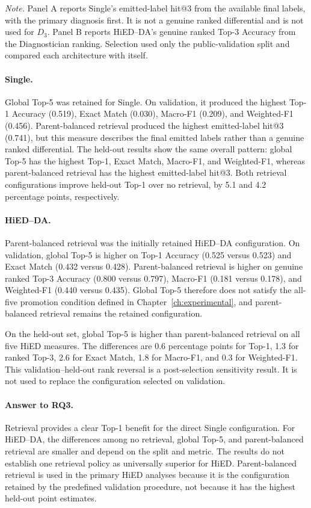 \begin{table}[H]
\parbox{0.96\textwidth}{\footnotesize
\textit{Note.} Panel A reports Single's emitted-label hit@3 from the available final labels, with the primary diagnosis first. It is not a genuine ranked differential and is not used for $D_3$. Panel B reports HiED--DA's genuine ranked Top-3 Accuracy from the Diagnostician ranking. Selection used only the public-validation split and compared each architecture with itself.
}
\end{table}

\paragraph{Single.}
Global Top-5 was retained for Single. On validation, it produced the highest Top-1 Accuracy (0.519), Exact Match (0.030), Macro-F1 (0.209), and Weighted-F1 (0.456). Parent-balanced retrieval produced the highest emitted-label hit@3 (0.741), but this measure describes the final emitted labels rather than a genuine ranked differential. The held-out results show the same overall pattern: global Top-5 has the highest Top-1, Exact Match, Macro-F1, and Weighted-F1, whereas parent-balanced retrieval has the highest emitted-label hit@3. Both retrieval configurations improve held-out Top-1 over no retrieval, by 5.1 and 4.2 percentage points, respectively.

\paragraph{HiED--DA.}
Parent-balanced retrieval was the initially retained HiED--DA configuration. On validation, global Top-5 is higher on Top-1 Accuracy (0.525 versus 0.523) and Exact Match (0.432 versus 0.428). Parent-balanced retrieval is higher on genuine ranked Top-3 Accuracy (0.800 versus 0.797), Macro-F1 (0.181 versus 0.178), and Weighted-F1 (0.440 versus 0.435). Global Top-5 therefore does not satisfy the all-five promotion condition defined in Chapter~\ref{ch:experimental}, and parent-balanced retrieval remains the retained configuration.

On the held-out set, global Top-5 is higher than parent-balanced retrieval on all five HiED measures. The differences are 0.6 percentage points for Top-1, 1.3 for ranked Top-3, 2.6 for Exact Match, 1.8 for Macro-F1, and 0.3 for Weighted-F1. This validation--held-out rank reversal is a post-selection sensitivity result. It is not used to replace the configuration selected on validation.

\paragraph{Answer to RQ3.}
Retrieval provides a clear Top-1 benefit for the direct Single configuration. For HiED--DA, the differences among no retrieval, global Top-5, and parent-balanced retrieval are smaller and depend on the split and metric. The results do not establish one retrieval policy as universally superior for HiED. Parent-balanced retrieval is used in the primary HiED analyses because it is the configuration retained by the predefined validation procedure, not because it has the highest held-out point estimates.

